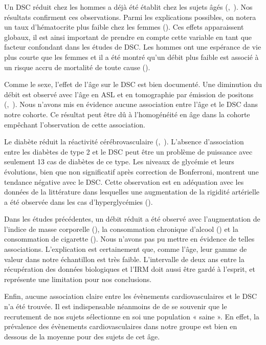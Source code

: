 Un DSC réduit chez les hommes a déjà été établit chez les sujets âgés (\cite{Liu2012},~\cite{Chen2011}). Nos résultats
confirment ces observations. Parmi les explications possibles, on notera un taux d’hématocrite plus
faible chez les femmes (\cite{Liu2012}). Ces effets apparaissent globaux, il est ainsi important de prendre en
compte cette variable en tant que facteur confondant dans les études de DSC. Les hommes ont une
espérance de vie plus courte que les femmes et il a été montré qu’un débit plus faible est associé à un
risque accru de mortalité de toute cause (\cite{Sabayan2013}).

Comme le sexe, l’effet de l’âge sur le DSC est bien documenté. Une diminution du débit est
observé avec l’âge en ASL et en tomographie par émission de positons (\cite{Chen2011},~\cite{Martin1991}). Nous n’avons mis
en évidence aucune association entre l’âge et le DSC dans notre cohorte. Ce résultat peut être dû à
l’homogénéité en âge dans la cohorte empêchant l’observation de cette association.

Le diabète réduit la réactivité cérébrovasculaire (\cite{Dandona1978},~\cite{Fulesdi1997}). L’absence d’association entre les
diabètes de type 2 et le DSC peut être un problème de puissance avec seulement 13 cas de diabètes
de ce type. Les niveaux de glycémie et leurs évolutions, bien que non significatif après correction de
Bonferroni, montrent une tendance négative avec le DSC. Cette observation est en adéquation avec
les données de la littérature dans lesquelles une augmentation de la rigidité artérielle a été observée
dans les cas d’hyperglycémies (\cite{Rubin2012}).

Dans les études précédentes, un débit réduit a été observé avec l’augmentation de l’indice de
masse corporelle (\cite{Willeumier2011}), la consommation chronique d’alcool (\cite{Schmidt2012}) et la consommation de cigarette
(\cite{Kubota1983}). Nous n’avons pas pu mettre en évidence de telles associations. L’explication est certainement
que, comme l’âge, leur gamme de valeur dans notre échantillon est très faible. L’intervalle de deux ans
entre la récupération des données biologiques et l’IRM doit aussi être gardé à l’esprit, et représente
une limitation pour nos conclusions.

Enfin, aucune association claire entre les évènements cardiovasculaires et le DSC n’a été
trouvée. Il est indispensable néanmoins de de se souvenir que le recrutement de nos sujets sélectionne
en soi une population « saine ». En effet, la prévalence des évènements cardiovasculaires dans notre
groupe est bien en dessous de la moyenne pour des sujets de cet âge.

